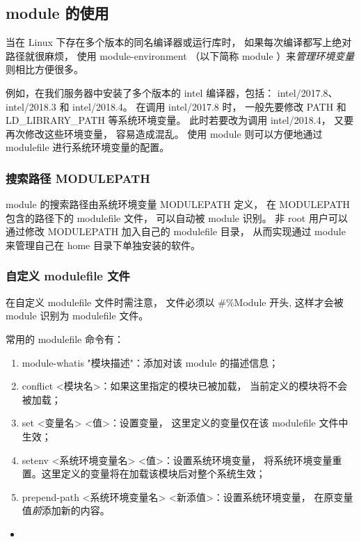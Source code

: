 \documentclass[UTF8]{ctexart}
\newcommand{\mynote}[1]{\colorbox{gray!35}{#1}}
\newcommand{\insertbash}[2]{\begin{itemize}\item[]\end{itemize}}
\begin{document}
\subsection{module 的使用}
当在 Linux 下存在多个版本的同名编译器或运行库时，
如果每次编译都写上绝对路径就很麻烦，
使用 module-environment （以下简称 module ）来{\em 管理环境变量}则相比方便很多。

例如，在我们服务器中安装了多个版本的 intel 编译器，包括：
intel/2017.8、intel/2018.3 和 intel/2018.4。
在调用 intel/2017.8 时，
一般先要修改 PATH 和 LD\_LIBRARY\_PATH 等系统环境变量。
此时若要改为调用 intel/2018.4，
又要再次修改这些环境变量，
容易造成混乱。
使用 module 则可以方便地通过 modulefile 进行系统环境变量的配置。

\subsubsection{搜索路径 MODULEPATH}
module 的搜索路径由系统环境变量 MODULEPATH 定义，
在 MODULEPATH 包含的路径下的 modulefile 文件，
可以自动被 module 识别。
非 root 用户可以通过修改 MODULEPATH 加入自己的 modulefile 目录，
从而实现通过 module 来管理自己在 home 目录下单独安装的软件。

\subsubsection{自定义 modulefile 文件}
在自定义 modulefile  文件时需注意，
文件必须以 \mynote{\#\%Module} 开头,
这样才会被 module 识别为 modulefile 文件。

常用的 modulefile 命令有：
\begin{enumerate}[\hspace{15mm}（1）]
  \item \mynote{module-whatis "模块描述"}：添加对该 module 的描述信息；
  \item \mynote{conflict <模块名>}：如果这里指定的模块已被加载，
    当前定义的模块将不会被加载；
  \item \mynote{set <变量名> <值>}：设置变量，
    这里定义的变量仅在该 modulefile 文件中生效；
  \item \mynote{setenv <系统环境变量名> <值>}：设置系统环境变量，
    将系统环境变量重置。这里定义的变量将在加载该模块后对整个系统生效；
  \item \mynote{prepend-path <系统环境变量名> <新添值>}：设置系统环境变量，
    在原变量值{\em 前}添加新的内容。
\end{enumerate}

\insertbash{material/module.sh}{modulefile 文件书写示例}
\end{document}
